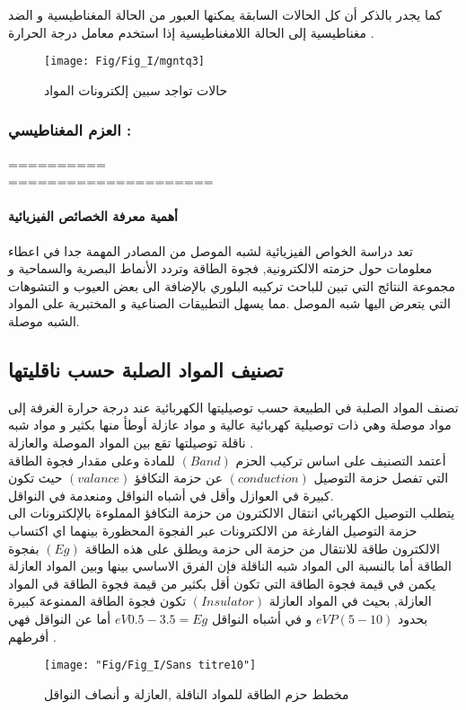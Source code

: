 	كما يجدر بالذكر أن كل الحالات السابقة يمكنها العبور من الحالة المغناطيسية و الضد مغناطيسية إلى الحالة اللامغناطيسية إذا استخدم معامل درجة الحرارة .
	
	\begin{figure}[h!]
		\centering
		\texttt{[image: Fig/Fig\_I/mgntq3]}
		\caption{حالات تواجد سبين إلكترونات المواد}
		\label{fig:mgntq3}
	\end{figure}
\FloatBarrier

		\subsubsection*{العزم المغناطيسي : }
		 ==========
		 \\
		 =====================
		 
\paragraph{أهمية معرفة الخصائص الفيزيائية }

تعد دراسة الخواص الفيزيائية لشبه الموصل من المصادر المهمة جدا في اعطاء معلومات حول حزمته الالكترونية, فجوة الطاقة وتردد الأنماط البصرية والسماحية و مجموعة النتائج التي تبين للباحث  تركيبه البلوري بالإضافة الى بعض العيوب و التشوهات التي يتعرض اليها شبه الموصل .مما يسهل التطبيقات الصناعية و المختبرية على المواد الشبه موصلة.

\subsection{تصنيف المواد الصلبة حسب ناقليتها }
تصنف المواد الصلبة في الطبيعة حسب توصيليتها الكهربائية عند
درجة حرارة الغرفة إلى مواد موصلة وهي ذات توصيلية كهربائية عالية و مواد عازلة أوطأ منها بكثير و مواد شبه ناقلة توصيلتها تقع بين المواد الموصلة والعازلة .\\
أعتمد التصنيف على اساس تركيب الحزم $ ( Band ) $ للمادة وعلى مقدار فجوة الطاقة التي تفصل حزمة التوصيل $ (conduction) $ عن حزمة التكافؤ $ (valance) $ حيث تكون كبيرة في العوازل وأقل في أشباه النواقل ومنعدمة في النواقل.\\
يتطلب التوصيل الكهربائي انتقال الالكترون من حزمة التكافؤ المملوءة بالإلكترونات الى حزمة التوصيل الفارغة من الالكترونات عبر الفجوة المحظورة بينهما اي اكتساب الالكترون طاقة للانتقال من حزمة الى حزمة ويطلق على هذه الطاقة $ (Eg) $ بفجوة الطاقة أما بالنسبة الى المواد شبه الناقلة فإن الفرق الاساسي بينها وبين المواد العازلة يكمن في قيمة فجوة الطاقة التي تكون أقل بكثير من قيمة فجوة الطاقة في المواد العازلة, بحيث  في المواد العازلة $ (  Insulator ) $ تكون فجوة الطاقة الممنوعة كبيرة بحدود $ eVP (5-10)  $ و في أشباه النواقل $ eV 0.5-3.5  = E{g} $ أما عن النواقل فهي أفرطهم .
\begin{figure}[h]
	\centering
	\texttt{[image: "Fig/Fig\_I/Sans titre10"]}
	\caption{مخطط حزم الطاقة للمواد الناقلة ,العازلة و أنصاف النواقل }
	\label{fig:sans-titre10}
\end{figure}
\FloatBarrier

